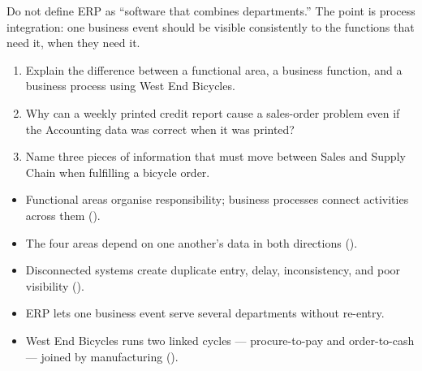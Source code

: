 \begin{pitfall}
Do not define ERP as ``software that combines departments.'' The point is
process integration: one business event should be visible consistently to the
functions that need it, when they need it.
\end{pitfall}

\begin{quickcheck}
\begin{enumerate}
  \item Explain the difference between a functional area, a business function, and a business process using West End Bicycles.
  \item Why can a weekly printed credit report cause a sales-order problem even if the Accounting data was correct when it was printed?
  \item Name three pieces of information that must move between Sales and Supply Chain when fulfilling a bicycle order.
\end{enumerate}
\end{quickcheck}

\begin{chapterrecap}
\begin{itemize}
  \item Functional areas organise responsibility; business processes connect activities across them ().
  \item The four areas depend on one another's data in both directions ().
  \item Disconnected systems create duplicate entry, delay, inconsistency, and poor visibility ().
  \item ERP lets one business event serve several departments without re-entry.
  \item West End Bicycles runs two linked cycles --- procure-to-pay and order-to-cash --- joined by manufacturing ().
\end{itemize}
\end{chapterrecap}
